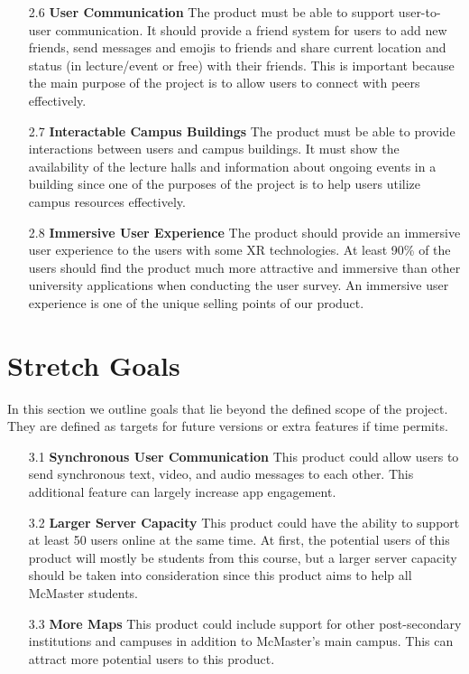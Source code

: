 \documentclass{article}
\begin{document}
\begin{itemize}
    \item[2.6] \textbf{User Communication} The product must be able to support user-to-user communication. It should provide a friend system for users to add new friends, send messages and emojis to friends and share current location and status (in lecture/event or free) with their friends. This is important because the main purpose of the project is to allow users to connect with peers effectively.

    \item[2.7] \textbf{Interactable Campus Buildings} The product must be able to provide interactions between users and campus buildings. It must show the availability of the lecture halls and information about ongoing events in a building since one of the purposes of the project is to help users utilize campus resources effectively.

    \item[2.8] \textbf{Immersive User Experience} The product should provide an immersive user experience to the users with some XR technologies. At least 90\% of the users should find the product much more attractive and immersive than other university applications when conducting the user survey. An immersive user experience is one of the unique selling points of our product.
\end{itemize}

\section{Stretch Goals}

In this section we outline goals that lie beyond the defined scope of the project. They are defined as targets for future versions or extra features if time permits.

\begin{itemize}
    \item[3.1] \textbf{Synchronous User Communication} This product could allow users to send synchronous text, video, and audio messages to each other. This additional feature can largely increase app engagement.

    \item[3.2] \textbf{Larger Server Capacity} This product could have the ability to support at least 50 users online at the same time. At first, the potential users of this product will mostly be students from this course, but a larger server capacity should be taken into consideration since this product aims to help all McMaster students.

    \item[3.3] \textbf{More Maps} This product could include support for other post-secondary institutions and campuses in addition to McMaster's main campus. This can attract more potential users to this product.
\end{itemize}
\end{document}
